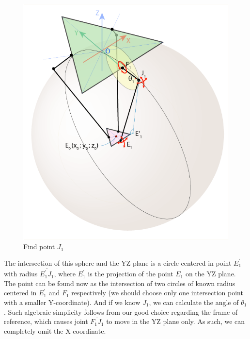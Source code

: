 \begin{figure}[H]
	\centering
	\includegraphics[width=\maxwidth{11cm}, keepaspectratio]{Chapters/Fig/find_point_J1.png}
	\caption{Find point $J_{1}$}
	\label{fig:find_point_J1}
\end{figure}
The intersection of this sphere and the YZ plane is a circle centered in point $E^{'}_{1}$ with radius $\overline{E^{'}_{1}J_{1}}$, where $E^{'}_{1}$ is the projection of the point $E_{1}$ on the YZ plane. The point can be found now as the intersection of two circles of known radius centered in $E^{'}_{1}$ and $F_{1}$ respectively (we should choose only one intersection point with a smaller Y-coordinate). And if we know $J_{1}$, we can calculate the angle of $\theta_{1}$.
Such algebraic simplicity follows from our good choice regarding the frame of reference, which causes joint $\overline{F_{1}J_{1}}$ to move in the YZ plane only. As such, we can completely omit the X coordinate.
